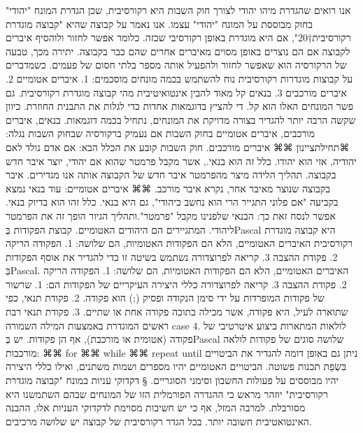       אנו רואים שהגדרת מיהו יהודי לצורך חוק השבות היא רקורסיבית, שכן הגדרת המונח "יהודי" בחוק מבוססת על המונח "יהודי" עצמו.
      אנו נאמר על קבוצה שהיא "קבוצה מוגדרת רקורסיבית†{20}", אם היא מוגדרת באופן רקורסיבי שכזה. כלומר אפשר לחזור ולוהסיף איברים לקבוצה אם הם נוצרים באופן מסוים מאיברים אחרים שהם כבר בקבוצה. יתירה מכך, טבעה של הרקורסיה הוא שאפשר לחזור ולהפעיל אותה מספר בלתי חסום של פעמים.
      כשמדברים על קבוצות מוגדרות רקורסיבית נוח להשתמש בכמה מונחים מוסכמים:
      1. איברים אטומיים
      2. איברים מורכבים
      3. בנאים
      קל מאוד להבין אינטואיטיבית מהי קבוצה מוגדרת רקורסיבית. גם פשר המונחים האלו הוא קל. די להציץ בדוגמאות אחדות כדי לגלות את התבנית החוזרת. כיוון שקשה הרבה יותר להגדיר בצורה מדויקת את המונחים, נתחיל בכמה דוגמאות.
      בנאים, איברים מורכבים, איברים אטומיים בחוק השבות
      אם נעמיק ברקורסיה שבחוק השבות נגלה:
      ⌘תחילת{ציינון}
      ⌘⌘ איברים מורכבים. חוק השבות קובע את הכלל הבא: אם אדם נולד לאם יהודיה, אזי הוא יהודו. כלל זה הוא בנאי., אשר מקבל פרמטר שהוא אם יהודי, יוצר איבר חדש בקבוצה. תהליך הלידה מיצר מהפרמטר איבר חדש של הקבוצה אותה אנו מגדירים. איבר בקבוצה שנוצר מאיבר אחר, נקרא איבר מורכב.
      ⌘⌘ איברים אטומיים: עוד בנאי נמצא בקביעה "אם פלוני התגייר הרי הוא נחשב כיהודי", גם היא בנאי. כלל זהו הוא בדיוק בנאי. אפשר לנסח זאת כך: הבנאי שלפנינו מקבל "פרמטר".ותהליך הגיור הופך זה את הפרמטר ליהודי. המתגיירים הם היהודים האטומיים.
      קבוצת הפקודות בְּPascal היא קבוצה מוגדרת רקורסיבית
      האיברים האטומיים, הלא הם הפקודות האטומיות, הם שלושה:
      1. הפקודה הריקה
      2. פקודת ההצבה
      3. קריאה לפרוצדורה
      נשתמש בשיטה זו כדי להגדיר את אוסף הפקודות בְּPascal. האיברים האטומיים, הלא הם הפקודות האטומיות, הם שלושה:
      1. הפקודה הריקה
      2. פקודת ההצבה
      3. קריאה לפרוצדורה
      כללי היצירה העיקריים של הפקודות הם:
      1. שרשור של פקודות המופרדות על ידי סימן הנקודה ופסיק (;) הוא פקודה.
      2. פקודת תנאי, כפי שתוארה לעיל, היא פקודה, אשר מכילה בתוכה פקודה אחת או שתיים.
      3. פקודת תנאי רבת ראשים המוגדרת באמצעות המילה השמורה case
      4. לולאות המתארות ביצוע איטרטיבי של פקודה (אטומית או מורכבת), אף הן פקודות. יש בְּPascal שלושה סוגים של פקודות לולאה מורכבות:
      ⌘⌘ for
      ⌘⌘ while
      ⌘⌘ repeat until
      ניתן גם באופן דומה להגדיר את הביטויים בִּשְׂפַת תכנות פשוטה. הביטויים האטומיים יהיו מספרים ושמות משתנים, ואילו כללי היצירה יהיו מבוססים על פעולות החשבון וסימני הסוגריים.
      § דקדוקי עניות במונח "קבוצה מוגדרת רקורסיבית"
      יוזהר מראש כי ההגדרה הפורמלית הזו של המונחים שבהם השתמשנו היא מסורבלת. למרבה המזל, אף כי יש חשיבות מסוימת לדקדוקי העניות אלו, ההבנה האינטואטיבית חשובה יותר.
      בכל הגדר רקורסיבית של קבוצה יש שלושה מרכיבים.
